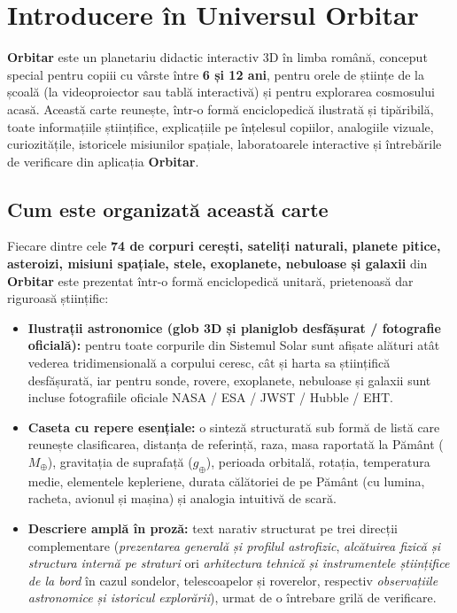 \chapter{Introducere în Universul Orbitar}
\label{chap:introducere}

\textbf{Orbitar} este un planetariu didactic interactiv 3D în limba română, conceput special pentru copiii cu vârste între \textbf{6 și 12 ani}, pentru orele de științe de la școală (la videoproiector sau tablă interactivă) și pentru explorarea cosmosului acasă. Această carte reunește, într-o formă enciclopedică ilustrată și tipăribilă, toate informațiile științifice, explicațiile pe înțelesul copiilor, analogiile vizuale, curiozitățile, istoricele misiunilor spațiale, laboratoarele interactive și întrebările de verificare din aplicația \textbf{Orbitar}.

\section{Cum este organizată această carte}

Fiecare dintre cele \textbf{74 de corpuri cerești, sateliți naturali, planete pitice, asteroizi, misiuni spațiale, stele, exoplanete, nebuloase și galaxii} din \textbf{Orbitar} este prezentat într-o formă enciclopedică unitară, prietenoasă dar riguroasă științific:

\begin{itemize}[leftmargin=1.5em, itemsep=4pt]
  \item \textbf{Ilustrații astronomice (glob 3D și planiglob desfășurat / fotografie oficială):} pentru toate corpurile din Sistemul Solar sunt afișate alături atât vederea tridimensională a corpului ceresc, cât și harta sa științifică desfășurată, iar pentru sonde, rovere, exoplanete, nebuloase și galaxii sunt incluse fotografiile oficiale NASA / ESA / JWST / Hubble / EHT.
  \item \textbf{Caseta cu repere esențiale:} o sinteză structurată sub formă de listă care reunește clasificarea, distanța de referință, raza, masa raportată la Pământ ($M_\oplus$), gravitația de suprafață ($g_\oplus$), perioada orbitală, rotația, temperatura medie, elementele kepleriene, durata călătoriei de pe Pământ (cu lumina, racheta, avionul și mașina) și analogia intuitivă de scară.
  \item \textbf{Descriere amplă în proză:} text narativ structurat pe trei direcții complementare (\emph{prezentarea generală și profilul astrofizic}, \emph{alcătuirea fizică și structura internă pe straturi} ori \emph{arhitectura tehnică și instrumentele științifice de la bord} în cazul sondelor, telescoapelor și roverelor, respectiv \emph{observațiile astronomice și istoricul explorării}), urmat de o întrebare grilă de verificare.
\end{itemize}

